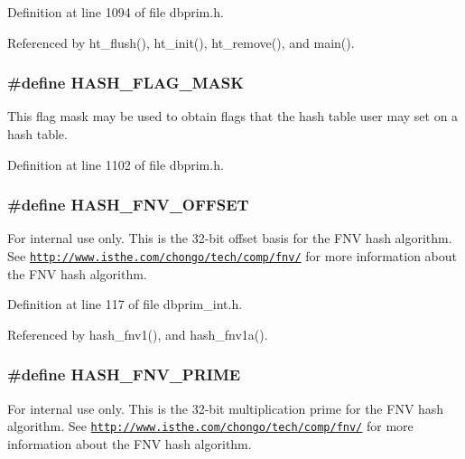 Definition at line 1094 of file dbprim.h.

Referenced by ht\_\-flush(), ht\_\-init(), ht\_\-remove(), and main().\hypertarget{group__dbprim__hash_ga24}{
\subsubsection[HASH\_\-FLAG\_\-MASK]{\setlength{\rightskip}{0pt plus 5cm}\#define HASH\_\-FLAG\_\-MASK}}
\label{group__dbprim__hash_ga24}


This flag mask may be used to obtain flags that the hash table user may set on a hash table.

Definition at line 1102 of file dbprim.h.\hypertarget{group__dbprim__hash_ga49}{
\subsubsection[HASH\_\-FNV\_\-OFFSET]{\setlength{\rightskip}{0pt plus 5cm}\#define HASH\_\-FNV\_\-OFFSET}}
\label{group__dbprim__hash_ga49}


\begin{Desc}
\item[For internal use only.]
This is the 32-bit offset basis for the FNV hash algorithm. See \href{http://www.isthe.com/chongo/tech/comp/fnv/}{\tt http://www.isthe.com/chongo/tech/comp/fnv/} for more information about the FNV hash algorithm.\end{Desc}


Definition at line 117 of file dbprim\_\-int.h.

Referenced by hash\_\-fnv1(), and hash\_\-fnv1a().\hypertarget{group__dbprim__hash_ga50}{
\subsubsection[HASH\_\-FNV\_\-PRIME]{\setlength{\rightskip}{0pt plus 5cm}\#define HASH\_\-FNV\_\-PRIME}}
\label{group__dbprim__hash_ga50}


\begin{Desc}
\item[For internal use only.]
This is the 32-bit multiplication prime for the FNV hash algorithm. See \href{http://www.isthe.com/chongo/tech/comp/fnv/}{\tt http://www.isthe.com/chongo/tech/comp/fnv/} for more information about the FNV hash algorithm.\end{Desc}


